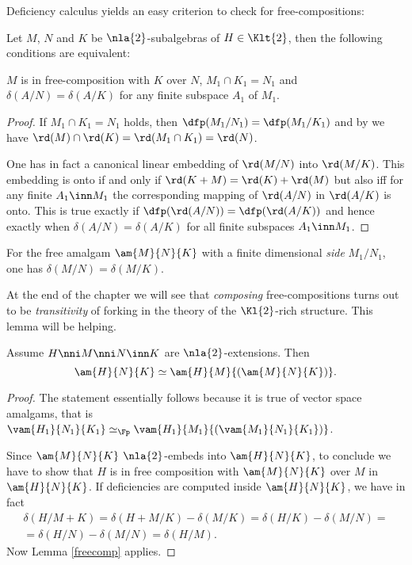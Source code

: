 Deficiency calculus yields an easy criterion to check for free-compositions:
\begin{lem}\label{freecomp}
Let $M$, $N$ and $K$ be $\nla{2}$-subalgebras of $H\in\Klt{2}$, then the following conditions are equivalent:
\begin{itemize}
$M$ is in free-composition with $K$ over $N$,
$M_{1}\cap K_{1}=N_{1}$ and $\delta(A/N)=\delta(A/K)$ for any finite subspace $A_{1}$ of $M_{1}$.
\end{itemize}
\end{lem}
\begin{proof}
If $M_{1}\cap K_{1}=N_{1}$ holds, then %
$\dfp(M_{1}/N_{1})=\dfp(M_{1}/K_{1})$ and by  we have
$\rd(M)\cap\rd(K)=\rd(M_{1}\cap K_{1})=\rd(N)$.

One has in fact a canonical linear embedding of $\rd(M/N)$ into $\rd(M/K)$. This embedding is onto
if and only if $\rd(K+M)=\rd(K)+\rd(M)$ but also iff
for any finite $A_{1}\inn M_{1}$ the corresponding mapping of $\rd(A/N)$ in $\rd(A/K)$ is onto.
This is true exactly if $\dfp(\rd(A/N))=\dfp(\rd(A/K))$ and hence exactly when
$\delta(A/N)=\delta(A/K)$ for all finite subspaces $A_{1}\inn M_{1}$.
\end{proof}

\begin{rem}
For the free amalgam $\am{M}{N}{K}$ with a finite dimensional
{\em side} $M_{1}/N_{1}$, one has $\delta(M/N)=\delta(M/K)$.
\end{rem}

At the end of the chapter we will see that
{\em composing} free-compositions turns out to be {\em transitivity} of forking in the theory of the $\Kl{2}$-rich structure.
This lemma will be helping.
\begin{lem}\label{fctrans}
Assume $H\nni M\nni N\inn K$ are $\nla{2}$-extensions. Then
$$\am{H}{N}{K}\simeq\am{H}{M}{(\am{M}{N}{K})}.$$
\end{lem}
\begin{proof}
The statement essentially follows because it is true of vector space amalgams, that is
$\vam{H_{1}}{N_{1}}{K_{1}}\simeq_{\Fp}\vam{H_{1}}{M_{1}}{(\vam{M_{1}}{N_{1}}{K_{1}})}$.

Since $\am{M}{N}{K}$ $\nla{2}$-embeds into $\am{H}{N}{K}$, to conclude we have to show that
$H$ is in free composition with $\am{M}{N}{K}$ over $M$ in $\am{H}{N}{K}$. If deficiencies are computed inside $\am{H}{N}{K}$,
we have in fact
\begin{multline*}
\delta(H/M+K)=\delta(H+M/K)-\delta(M/K)=\delta(H/K)-\delta(M/N)=\\
=\delta(H/N)-\delta(M/N)=\delta(H/M).
\end{multline*}
Now Lemma \ref{freecomp} applies.
\end{proof}

